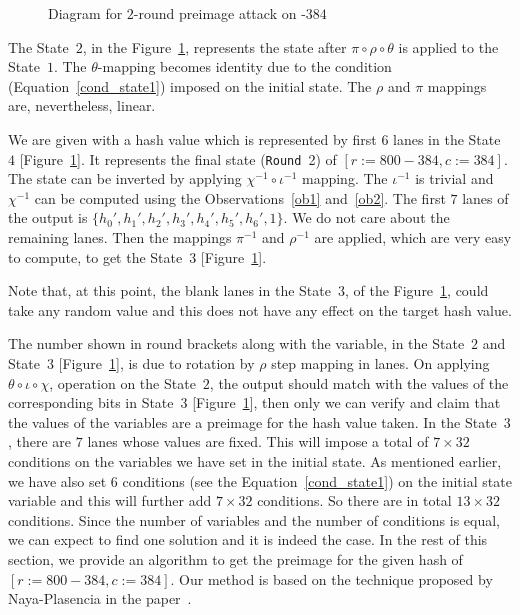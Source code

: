 \begin{figure}[!t]
\begin{center}
{
}
\caption{Diagram for $2$-round preimage attack on \Keccak-$384$ \label{atk}}
\end{center}
\end{figure}
The State~$2$, in the Figure~\ref{atk}, represents the state after $\pi \circ \rho \circ \theta$ is applied to the State~$1$. 
The $\theta$-mapping becomes identity due to the condition (Equation~\ref{cond_state1}) imposed on the initial state. The $\rho$ and $\pi$ mappings are, nevertheless, linear.

We are given with a hash value which is represented by first $6$ lanes in the State~$4$ [Figure~\ref{atk}]. It represents the final state ({\tt Round}~2) of \KECCAK{}$[r:=800-384, c:=384]$. The state can be inverted by applying $\chi^{-1} \circ \iota^{-1}$ mapping. The $\iota^{-1}$ is trivial and $\chi^{-1}$ can be computed using the Observations~\ref{ob1} and~\ref{ob2}. The first $7$ lanes of the output is $\{h_0',h_1',h_2',h_3',h_4',h_5',h_6',1\}$. We do not care about the remaining  lanes. 
Then the mappings $\pi^{-1}$ and $\rho^{-1}$ are applied, which are very easy to compute, to get the State~$3$ [Figure~\ref{atk}]. 

Note that, at this point, the blank lanes in the State~$3$, of the Figure~\ref{atk}, could take any random value and this does not have any effect on the target hash value.

The number shown in round brackets along with the variable, in the State~$2$ and State~$3$ [Figure~\ref{atk}], is due to rotation by $\rho$ step mapping in lanes.
On applying $\theta \circ \iota \circ \chi$, operation on the State~$2$, the output should match with the values of the corresponding bits in State~$3$ [Figure~\ref{atk}], then only we can verify and claim that the values of the variables are a preimage for the hash value taken. In the State~$3$, there are $7$ lanes whose values are fixed. 
This will impose a total of $7\times 32$ conditions on the variables we have set in the initial state. As mentioned earlier, we have also set $6$ conditions (see the Equation~\ref{cond_state1}) on the initial state variable and this will further add $7 \times 32$ conditions. So there are in total $13\times 32$ conditions. Since the number of variables and the number of conditions is equal, we can expect to find one solution and it is indeed the case. In the rest of this section, we provide an algorithm to get the preimage for the given hash of  \KECCAK{}$[r:=800-384, c:=384]$. Our method is based on the technique proposed by Naya-Plasencia \etal in the paper~\cite{naya2011practical}.

